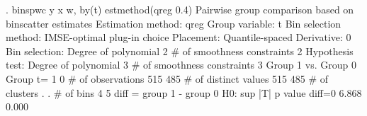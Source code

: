. binspwc y x w, by(t) estmethod(qreg 0.4)
{\smallskip}
Pairwise group comparison based on binscatter estimates
Estimation method: qreg
Group variable: t
Bin selection method: IMSE-optimal plug-in choice
Placement: Quantile-spaced
Derivative: 0
Bin selection:                {\VBAR} 
         Degree of polynomial {\VBAR}       2
  \# of smoothness constraints {\VBAR}       2
Hypothesis test:              {\VBAR} 
         Degree of polynomial {\VBAR}       3
  \# of smoothness constraints {\VBAR}       3
{\smallskip}
Group 1 vs. Group 0
Group t=                      {\VBAR}      1   {\VBAR}     0
\# of observations             {\VBAR}     515  {\VBAR}     485
\# of distinct values          {\VBAR}     515  {\VBAR}     485
\# of clusters                 {\VBAR}       .  {\VBAR}       .
\# of bins                     {\VBAR}       4  {\VBAR}       5
{\smallskip}
diff = group 1 - group 0
H0:                {\VBAR} sup |T|           p value
diff=0             {\VBAR}   6.868             0.000
{\smallskip}
